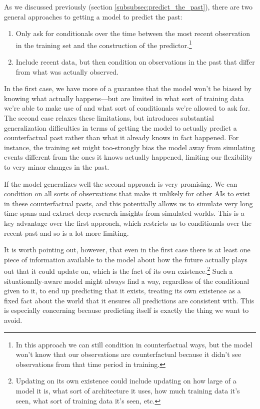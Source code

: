 \documentclass[
  onecolumn,
  nonatbib,
]{miri-tech-article}
\begin{document}
As we discussed previously (section \ref{subsubsec:predict_the_past}), there are two general approaches to getting a model to predict the past:

\begin{enumerate}
\item Only ask for conditionals over the time between the most recent observation in the training set and the construction of the predictor.\footnote{In this approach we can still condition in counterfactual ways, but the model won't know that our observations are counterfactual because it didn't see observations from that time period in training.}
\item Include recent data, but then condition on observations in the past that differ from what was actually observed.
\end{enumerate}

In the first case, we have more of a guarantee that the model won't be biased by knowing what actually happens---but are limited in what sort of training data we're able to make use of and what sort of conditionals we're allowed to ask for. The second case relaxes these limitations, but introduces substantial generalization difficulties in terms of getting the model to actually predict a counterfactual past rather than what it already knows in fact happened. For instance, the training set might too-strongly bias the model away from simulating events different from the ones it knows actually happened, limiting our flexibility to very minor changes in the past.

If the model generalizes well the second approach is very promising. We can condition on all sorts of observations that make it unlikely for other AIs to exist\cite{conditioning_generative_models} in these counterfactual pasts, and this potentially allows us to simulate very long time-spans and extract deep research insights from simulated worlds. This is a key advantage over the first approach, which restricts us to conditionals over the recent past and so is a lot more limiting\cite{conditioning_generative_models_with_restrictions}.

It is worth pointing out, however, that even in the first case there is at least one piece of information available to the model about how the future actually plays out that it could update on, which is the fact of its own existence.\footnote{Updating on its own existence could include updating on how large of a model it is, what sort of architecture it uses, how much training data it's seen, what sort of training data it's seen, etc.} Such a situationally-aware model might always find a way, regardless of the conditional given to it, to end up predicting that it exists, treating its own existence as a fixed fact about the world that it ensures all predictions are consistent with. This is especially concerning because predicting itself is exactly the thing we want to avoid.
\end{document}
